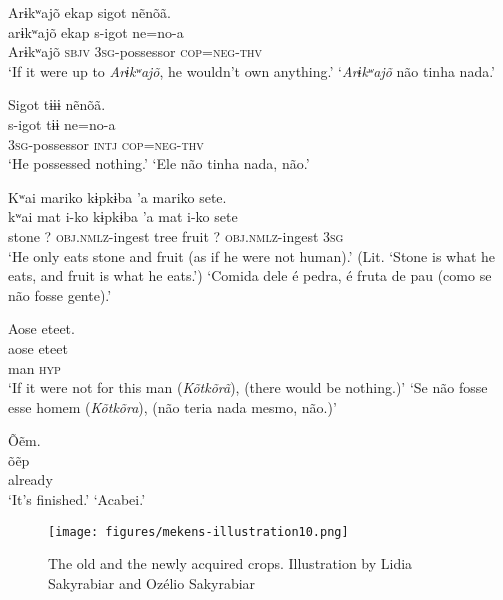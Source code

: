 \documentclass[output=paper,
modfonts,nonflat
]{langsci/langscibook}
\begin{document}
\ea Arɨkʷajõ ekap sigot nẽnõã.\\[.3em]
\gll arɨkʷajõ ekap s-igot ne=no-a\\
     Arɨkʷajõ \textsc{sbjv} \textsc{3sg}-possessor \textsc{cop}=\textsc{neg}-\textsc{thv}\\
\glt ‘If it were up to \textit{Arɨkʷajõ}, he wouldn't own anything.’
\glt ‘\textit{Arɨkʷajõ} não tinha nada.'
\z 

\ea Sigot tɨɨɨ nẽnõã.\\[.3em]
\gll s-igot tɨɨ ne=no-a\\
     \textsc{3sg}-possessor \textsc{intj} \textsc{cop}=\textsc{neg}-\textsc{thv}\\
\glt ‘He possessed nothing.’
\glt ‘Ele não tinha nada, não.'
\z 


\ea Kʷai mariko kɨpkɨba 'a mariko{\footnotemark} sete.\\[.3em]
\gll kʷai mat i-ko kɨpkɨba 'a mat i-ko sete\\
     stone ? \textsc{obj.nmlz}-ingest tree fruit ? \textsc{obj.nmlz}-ingest \textsc{3sg}\\
\glt ‘He only eats stone and fruit (as if he were not human).’ (Lit. ‘Stone is what he eats, and fruit is what he eats.’)
\glt ‘Comida dele é pedra, é fruta de pau (como se não fosse gente).'
\z 

\ea Aose eteet.\\[.3em]
\gll aose eteet\\
     man \textsc{hyp}\\
\glt ‘If it were not for this man (\textit{Kõtkõrã}), (there would be nothing.)’
\glt ‘Se não fosse esse homem (\textit{Kõtkõra}), (não teria nada mesmo, não.)'
\z 

\ea Õẽm.\\[.3em]
\gll õẽp\\
     already\\
\glt ‘It's finished.’
\glt ‘Acabei.'
\z 

\begin{figure}
\texttt{[image: figures/mekens-illustration10.png]}
  \caption{The old and the newly acquired crops. Illustration by Lidia Sakyrabiar and Ozélio Sakyrabiar}
\end{figure}
\end{document}

